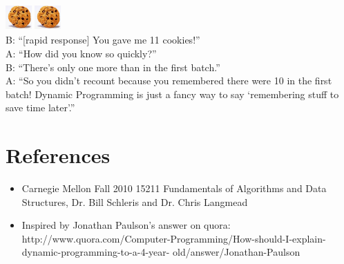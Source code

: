 \documentclass[12pt]{article}
\begin{document}
\includegraphics[height=10mm, width=10mm]{cookie.jpg}
\includegraphics[height=10mm, width=10mm]{cookie.jpg}
\\
B: ``[rapid response] You gave me 11 cookies!''\\
A: ``How did you know so quickly?''\\
B: ``There's only one more than in the first batch.''\\
A: ``So you didn't recount because you remembered there were 10 in the first batch! Dynamic Programming is just a fancy way to say `remembering stuff to save time later'.''
\newpage
\section{References}

\begin{itemize}
\item Carnegie Mellon Fall 2010 15211 Fundamentals of Algorithms and Data Structures, Dr. Bill Schleris and Dr. Chris Langmead
\item Inspired by Jonathan Paulson's answer on quora:
http://www.quora.com/Computer-Programming/How-should-I-explain-dynamic-programming-to-a-4-year- old/answer/Jonathan-Paulson
\end{itemize}
\end{document}
